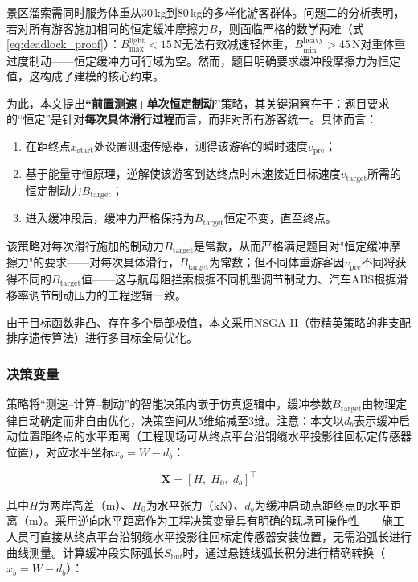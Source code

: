 \documentclass[12pt,a4paper]{ctexart}
\begin{document}
景区溜索需同时服务体重从30\,kg到80\,kg的多样化游客群体。问题二的分析表明，若对所有游客施加相同的恒定缓冲摩擦力$B$，则面临严格的数学两难（式\ref{eq:deadlock_proof}）：$B_{\max}^{\text{light}}<15$\,N无法有效减速轻体重，$B_{\min}^{\text{heavy}}>45$\,N对重体重过度制动——恒定缓冲力可行域为空。然而，题目明确要求缓冲段摩擦力为恒定值，这构成了建模的核心约束。

为此，本文提出\textbf{``前置测速+单次恒定制动''}策略，其关键洞察在于：题目要求的``恒定''是针对\textbf{每次具体滑行过程}而言，而非对所有游客统一。具体而言：

\begin{enumerate}[label=(\arabic*), leftmargin=2em]
  \item 在距终点$x_{\text{start}}$处设置测速传感器，测得该游客的瞬时速度$v_{\text{pre}}$；
  \item 基于能量守恒原理，逆解使该游客到达终点时末速接近目标速度$v_{\text{target}}$所需的恒定制动力$B_{\text{target}}$；
  \item 进入缓冲段后，缓冲力严格保持为$B_{\text{target}}$恒定不变，直至终点。
\end{enumerate}

该策略对每次滑行施加的制动力$B_{\text{target}}$是常数，从而严格满足题目对"恒定缓冲摩擦力"的要求——对每次具体滑行，$B_{\text{target}}$为常数；但不同体重游客因$v_{\text{pre}}$不同将获得不同的$B_{\text{target}}$值——这与航母阻拦索根据不同机型调节制动力、汽车ABS根据滑移率调节制动压力的工程逻辑一致。

由于目标函数非凸、存在多个局部极值，本文采用NSGA-II（带精英策略的非支配排序遗传算法）进行多目标全局优化。

\subsubsection{决策变量}

策略将``测速--计算--制动''的智能决策内嵌于仿真逻辑中，缓冲参数$B_{\text{target}}$由物理定律自动确定而非自由优化，决策空间从5维缩减至3维。注意：本文以$d_b$表示缓冲启动位置距终点的水平距离（工程现场可从终点平台沿钢缆水平投影往回标定传感器位置），对应水平坐标$x_b=W-d_b$：

\begin{equation}
  \mathbf{X} = \left[H,\; H_0,\; d_b\right]^\top
  \label{eq:decision_var}
\end{equation}

其中$H$为两岸高差（m）、$H_0$为水平张力（kN）、$d_b$为缓冲启动点距终点的水平距离（m）。采用逆向水平距离作为工程决策变量具有明确的现场可操作性——施工人员可直接从终点平台沿钢缆水平投影往回标定传感器安装位置，无需沿弧长进行曲线测量。计算缓冲段实际弧长$S_{\text{buf}}$时，通过悬链线弧长积分进行精确转换（$x_b = W-d_b$）：
\end{document}
